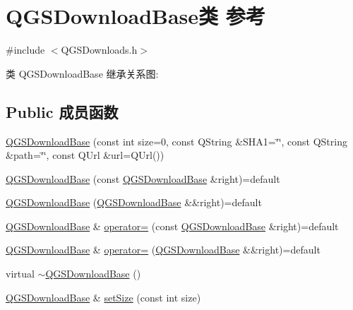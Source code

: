\hypertarget{class_q_g_s_download_base}{}\section{Q\+G\+S\+Download\+Base类 参考}
\label{class_q_g_s_download_base}


{\ttfamily \#include $<$Q\+G\+S\+Downloads.\+h$>$}



类 Q\+G\+S\+Download\+Base 继承关系图\+:
\subsection*{Public 成员函数}
\begin{DoxyCompactItemize}
\item 
\mbox{\hyperlink{class_q_g_s_download_base_a6968227b9537ee1f171f84cf9f5cb0e9}{Q\+G\+S\+Download\+Base}} (const int size=0, const Q\+String \&S\+H\+A1=\char`\"{}\char`\"{}, const Q\+String \&path=\char`\"{}\char`\"{}, const Q\+Url \&url=Q\+Url())
\item 
\mbox{\hyperlink{class_q_g_s_download_base_ade2e1988b008052b9de6c78cb5580e89}{Q\+G\+S\+Download\+Base}} (const \mbox{\hyperlink{class_q_g_s_download_base}{Q\+G\+S\+Download\+Base}} \&right)=default
\item 
\mbox{\hyperlink{class_q_g_s_download_base_a9e92533b438588fb82dd360dd15a855b}{Q\+G\+S\+Download\+Base}} (\mbox{\hyperlink{class_q_g_s_download_base}{Q\+G\+S\+Download\+Base}} \&\&right)=default
\item 
\mbox{\hyperlink{class_q_g_s_download_base}{Q\+G\+S\+Download\+Base}} \& \mbox{\hyperlink{class_q_g_s_download_base_af6c6f308f63d6eed15c613ff700128e1}{operator=}} (const \mbox{\hyperlink{class_q_g_s_download_base}{Q\+G\+S\+Download\+Base}} \&right)=default
\item 
\mbox{\hyperlink{class_q_g_s_download_base}{Q\+G\+S\+Download\+Base}} \& \mbox{\hyperlink{class_q_g_s_download_base_a4525cdb0613715fa6163b68fa041c3af}{operator=}} (\mbox{\hyperlink{class_q_g_s_download_base}{Q\+G\+S\+Download\+Base}} \&\&right)=default
\item 
virtual \mbox{\hyperlink{class_q_g_s_download_base_af138648437a54534a47118dd259c2e2e}{$\sim$\+Q\+G\+S\+Download\+Base}} ()
\item 
\mbox{\hyperlink{class_q_g_s_download_base}{Q\+G\+S\+Download\+Base}} \& \mbox{\hyperlink{class_q_g_s_download_base_a5698f198e6f837920861da6948dad47e}{set\+Size}} (const int size)
\item 

\end{DoxyCompactItemize}
